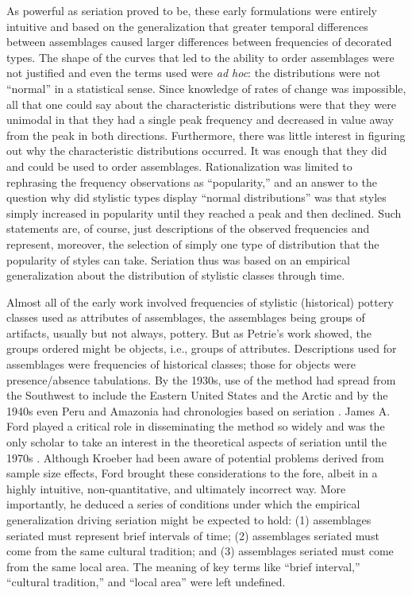 \documentclass[10pt,letterpaper]{article}
\begin{document}
As powerful as seriation proved to be, these early formulations were entirely intuitive and based on the generalization that greater   temporal differences between assemblages caused larger differences between frequencies of  decorated types. The shape of the curves that led to the ability to order assemblages were not justified and even the terms used were \emph{ad hoc}: the distributions were not “normal” in a statistical sense. Since knowledge of rates of change was impossible, all that one could say about the characteristic distributions were that they were unimodal in that they had a single peak frequency and decreased in value away from the peak in both directions. Furthermore, there was little interest in figuring out why the characteristic distributions occurred. It was enough that they did and could be used to order assemblages. Rationalization was limited to rephrasing the frequency observations as “popularity,” and an answer to the question why did stylistic types display “normal distributions” was that styles simply increased in popularity until they reached a peak and then declined. Such statements are, of course, just descriptions of the observed frequencies and represent, moreover, the selection of simply one type of distribution that the popularity of styles can take. Seriation thus was based on an empirical generalization about the distribution of stylistic classes through time. 

Almost all of the early work involved frequencies of stylistic (historical) pottery classes used as attributes of assemblages, the assemblages being groups of artifacts, usually but not always, pottery. But as Petrie’s work showed, the groups ordered might be objects, i.e., groups of attributes. Descriptions used for assemblages were frequencies of historical classes; those for objects were presence/absence tabulations. By the 1930s, use of the method had spread from the Southwest to include the Eastern United States and the Arctic and by the 1940s even Peru and Amazonia had chronologies based on seriation  \cite{Collins1937aa,Meggers1957}. James A. Ford \cite{Ford:1938aa, Ford:1962aa} played a critical role in disseminating the method so widely and was the only scholar to take an interest in the theoretical aspects of seriation until the 1970s \cite{Dunnell1971aa,o1998brief, OBrien1999aa}. Although Kroeber had been aware of potential problems derived from sample size effects, Ford brought these considerations to the fore, albeit in a highly intuitive, non-quantitative, and ultimately incorrect way. More importantly, he deduced a series of conditions under which the empirical generalization driving seriation might be expected to hold: (1) assemblages seriated must represent brief intervals of time; (2) assemblages seriated must come from the same cultural tradition; and (3) assemblages seriated must come from the same local area. The meaning of key terms like “brief interval,” “cultural tradition,” and “local area” were left undefined.
\end{document}
